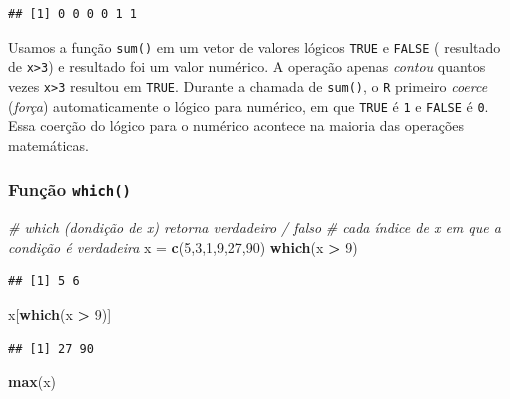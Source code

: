 \documentclass[
]{book}
\newenvironment{Shaded}{\begin{snugshade}}{\end{snugshade}}
\newcommand{\CommentTok}[1]{\textcolor[rgb]{0.56,0.35,0.01}{\textit{#1}}}
\newcommand{\DecValTok}[1]{\textcolor[rgb]{0.00,0.00,0.81}{#1}}
\newcommand{\KeywordTok}[1]{\textcolor[rgb]{0.13,0.29,0.53}{\textbf{#1}}}
\newcommand{\NormalTok}[1]{#1}
\newcommand{\OperatorTok}[1]{\textcolor[rgb]{0.81,0.36,0.00}{\textbf{#1}}}
\newcommand{\StringTok}[1]{\textcolor[rgb]{0.31,0.60,0.02}{#1}}
\theoremstyle{definition}
\theoremstyle{definition}
\theoremstyle{definition}
\theoremstyle{remark}
\begin{document}
\begin{verbatim}
## [1] 0 0 0 0 1 1
\end{verbatim}

Usamos a função \texttt{sum()} em um vetor de valores lógicos \texttt{TRUE} e \texttt{FALSE} ( resultado de \texttt{x\textgreater{}3}) e resultado foi um valor numérico. A operação apenas \emph{contou} quantos vezes \texttt{x\textgreater{}3} resultou em \texttt{TRUE}. Durante a chamada de \texttt{sum()}, o \texttt{R} primeiro \emph{coerce} (\emph{força}) automaticamente o lógico para numérico, em que \texttt{TRUE} é \texttt{1} e \texttt{FALSE} é \texttt{0}. Essa coerção do lógico para o numérico acontece na maioria das operações matemáticas.

\hypertarget{funuxe7uxe3o-which}{%
\subsubsection{\texorpdfstring{Função \texttt{which()}}{Função which()}}\label{funuxe7uxe3o-which}}

\begin{Shaded}
\begin{Highlighting}[]
\CommentTok{# which (dondição de x) retorna verdadeiro / falso}
\CommentTok{# cada índice de x em que a condição é verdadeira}
\NormalTok{x =}\StringTok{ }\KeywordTok{c}\NormalTok{(}\DecValTok{5}\NormalTok{,}\DecValTok{3}\NormalTok{,}\DecValTok{1}\NormalTok{,}\DecValTok{9}\NormalTok{,}\DecValTok{27}\NormalTok{,}\DecValTok{90}\NormalTok{)}
\KeywordTok{which}\NormalTok{(x }\OperatorTok{>}\StringTok{ }\DecValTok{9}\NormalTok{)}
\end{Highlighting}
\end{Shaded}

\begin{verbatim}
## [1] 5 6
\end{verbatim}

\begin{Shaded}
\begin{Highlighting}[]
\NormalTok{x[}\KeywordTok{which}\NormalTok{(x }\OperatorTok{>}\StringTok{ }\DecValTok{9}\NormalTok{)]}
\end{Highlighting}
\end{Shaded}

\begin{verbatim}
## [1] 27 90
\end{verbatim}

\begin{Shaded}
\begin{Highlighting}[]
\KeywordTok{max}\NormalTok{(x)}
\end{Highlighting}
\end{Shaded}
\end{document}
